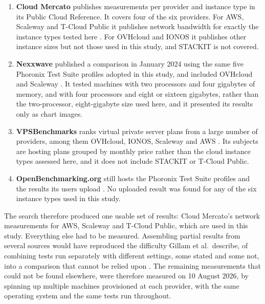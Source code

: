 \begin{enumerate}
  \item \textbf{Cloud Mercato} publishes measurements per provider and instance
  type in its Public Cloud Reference. It covers four of the six providers. For
  \acs{AWS}, Scaleway and T-Cloud Public it publishes network bandwidth for exactly
  the instance types tested here \cite{CloudMercato_AWS_m6i,CloudMercato_Scaleway_POP2,CloudMercato_TSystems_s3}.
  For OVHcloud and IONOS it publishes other instance sizes but not those used in
  this study, and STACKIT is not covered.

  \item \textbf{Nexxwave} published a comparison in January 2024 using the same five
  Phoronix Test Suite profiles adopted in this study, and included OVHcloud and
  Scaleway \cite{Nexxwave_2024}. It tested machines with two processors and four
  gigabytes of memory, and with four processors and eight or sixteen gigabytes,
  rather than the two-processor, eight-gigabyte size used here, and it presented
  its results only as chart images.

  \item \textbf{VPSBenchmarks} ranks virtual private server plans from a large
  number of providers, among them OVHcloud, IONOS, Scaleway and \acs{AWS}
  \cite{VPSBenchmarks_2024}. Its subjects are hosting plans grouped by monthly
  price rather than the cloud instance types assessed here, and it does not
  include STACKIT or T-Cloud Public.

  \item \textbf{OpenBenchmarking.org} still hosts the Phoronix Test Suite profiles
  and the results its users upload \cite{OpenBenchmarking_org}. No uploaded result
  was found for any of the six instance types used in this study.
\end{enumerate}

The search therefore produced one usable set of results: Cloud Mercato's network
measurements for \acs{AWS}, Scaleway and T-Cloud Public, which are used in this
study. Everything else had to be measured. Assembling partial results from
several sources would have reproduced the difficulty Gillam et al.\ describe, of
combining tests run separately with different settings, some stated and some not,
into a comparison that cannot be relied upon \cite{Gillam_FairBenchmarking_2013}.
The remaining measurements that could not be found elsewhere, were therefore measured on 10 August 2026,
by spinning up multiple machines provisioned at each provider, with the same operating
system and the same tests run throughout.


